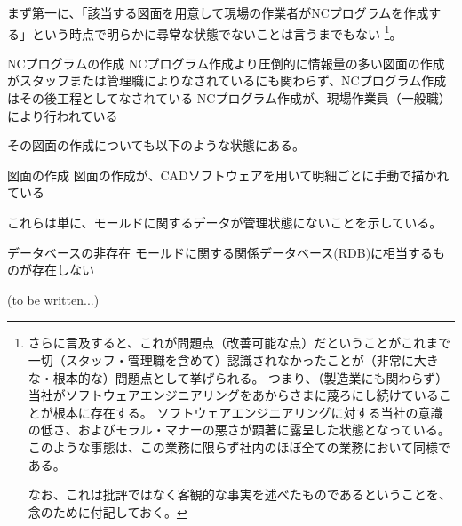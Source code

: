 まず第一に、「該当する図面を用意して現場の作業者がNCプログラムを作成する」という時点で明らかに尋常な状態でないことは言うまでもない
\footnote{さらに言及すると、これが問題点（改善可能な点）だということがこれまで一切（スタッフ・管理職を含めて）認識されなかったことが（非常に大きな・根本的な）問題点として挙げられる。
つまり、（製造業にも関わらず）当社がソフトウェアエンジニアリングをあからさまに蔑ろにし続けていることが根本に存在する。
ソフトウェアエンジニアリングに対する当社の意識の低さ、およびモラル・マナーの悪さが顕著に露呈した状態となっている。
このような事態は、この業務に限らず社内のほぼ全ての業務において同様である。

なお、これは批評ではなく客観的な事実を述べたものであるということを、念のために付記しておく。}。
\begin{Issues}{NCプログラムの作成}
NCプログラム作成より圧倒的に情報量の多い図面の作成がスタッフまたは管理職によりなされているにも関わらず、NCプログラム作成はその後工程としてなされている
\tcbline*
NCプログラム作成が、現場作業員（一般職）により行われている
\end{Issues}
その図面の作成についても以下のような状態にある。
\begin{Issues}{図面の作成}
図面の作成が、CADソフトウェアを用いて明細ごとに手動で描かれている
\end{Issues}
これらは単に、モールドに関するデータが管理状態にないことを示している。
\begin{Issues}{データベースの非存在}
モールドに関する関係データベース(RDB)に相当するものが存在しない
\end{Issues}



\clearpage
\modHeadsection{\TBW}
(to be written...)






